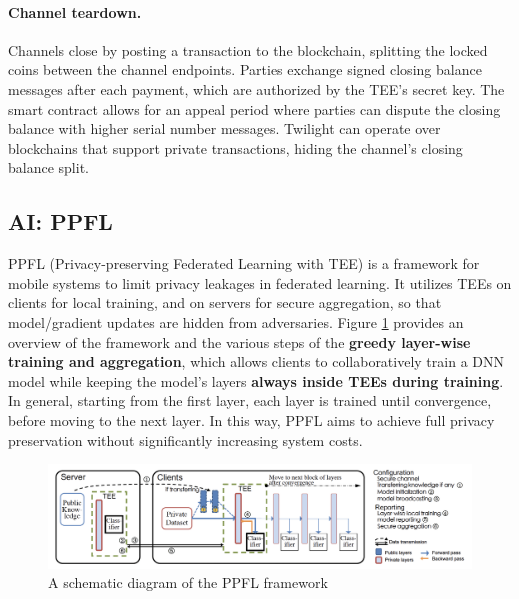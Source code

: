 \documentclass[lang=en]{sjtuarticle}
\begin{document}
\paragraph{Channel teardown.}

Channels close by posting a transaction to the blockchain, splitting the locked coins between the channel endpoints.
Parties exchange signed closing balance messages after each payment, which are authorized by the TEE's secret key.
The smart contract allows for an appeal period where parties can dispute the closing balance with higher serial number messages.
Twilight can operate over blockchains that support private transactions, hiding the channel's closing balance split.



\subsection{AI: PPFL}

PPFL (Privacy-preserving Federated Learning with TEE) \cite{mo2021ppfl} is a framework for mobile systems to limit privacy leakages
in federated learning. It utilizes TEEs on clients for local training, and on servers
for secure aggregation, so that model/gradient updates are hidden
from adversaries. Figure \ref{fig:ppfl} provides an overview of the framework and the various
steps of the \textbf{greedy layer-wise training and aggregation}, which allows clients to collaboratively train a DNN model while
keeping the model's layers \textbf{always inside TEEs during training}. In general,
starting from the first layer, each layer is trained until convergence,
before moving to the next layer. In this way, PPFL aims to achieve
full privacy preservation without significantly increasing system
costs.

\begin{figure}[h]
    \centering
    \includegraphics[width=\textwidth]{ppfl.png}
    \caption{A schematic diagram of the PPFL framework}
    \label{fig:ppfl}
\end{figure}
\end{document}
